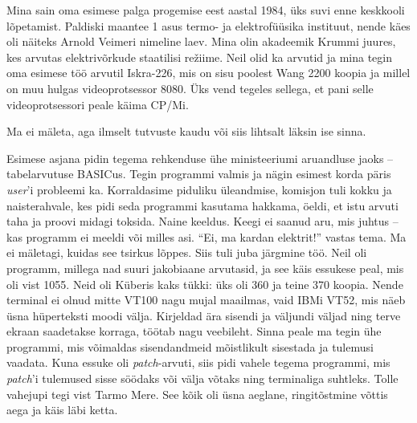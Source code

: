 Mina sain oma esimese palga progemise eest aastal 1984, 
üks suvi enne keskkooli lõpetamist. Paldiski maantee 1 asus termo- ja 
elektrofüüsika instituut, nende käes oli näiteks Arnold Veimeri nimeline laev.
Mina olin akadeemik Krummi juures, 
kes arvutas elektri{\-}võrkude staatilisi režiime. Neil olid ka 
arvutid ja mina tegin oma esimese töö arvutil 
Iskra-226, mis on sisu poolest Wang 2200 koopia ja millel on muu hulgas videoprotsessor
8080. Üks vend tegeles sellega, et 
pani selle videoprotsessori peale käima CP/Mi. 


Ma ei mäleta, aga ilmselt tutvuste 
kaudu või siis lihtsalt läksin ise sinna.


Esimese asjana pidin tegema rehkenduse ühe
ministeeriumi aruandluse jaoks -- tabelarvutuse BASICus. Tegin programmi valmis ja nägin esimest korda 
päris \emph{user}'i probleemi ka. Korraldasime piduliku üleandmise, 
komisjon tuli 
kokku ja naisterahvale, kes pidi seda 
programmi kasutama hakkama, öeldi, et istu arvuti taha ja proovi 
midagi toksida. Naine keeldus. Keegi ei saanud aru, 
mis juhtus -- kas programm ei meeldi või milles asi. \enquote{Ei, ma kardan 
elektrit!} vastas tema. Ma ei mäletagi, kuidas see tsirkus lõppes. 
Siis tuli juba järgmine töö. Neil oli programm, millega nad suuri jakobiaane 
arvutasid, ja see käis essukese peal, mis oli vist 1055. Neid 
oli Küberis kaks tükki: üks oli 360 ja teine 370 koopia. Nende terminal ei olnud 
mitte VT100 nagu mujal maailmas, vaid IBMi VT52, mis näeb üsna 
hüperteksti moodi välja. Kirjeldad ära sisendi ja väljundi väljad ning terve 
ekraan saadetakse korraga, töötab nagu veebileht. Sinna peale 
ma tegin ühe programmi, mis võimaldas sisendandmeid mõistlikult sisestada ja tulemusi vaadata. Kuna essuke oli \emph{patch}-arvuti, siis pidi 
vahele tegema programmi, mis \emph{patch}'i tulemused 
sisse söödaks või välja võtaks ning 
terminaliga suhtleks. Tolle vahejupi tegi vist Tarmo Mere. See kõik oli üsna aeglane, ringitõstmine võttis
aega ja käis läbi ketta.


